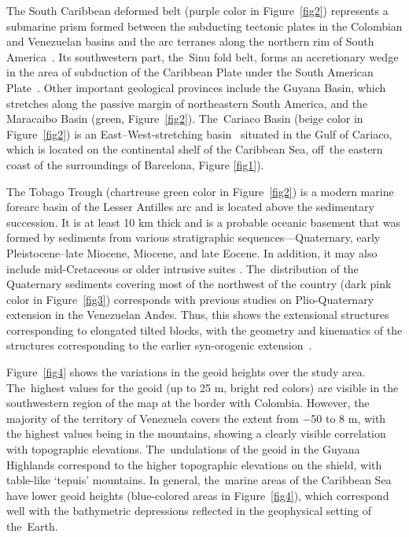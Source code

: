 \documentclass[sustainability,article,accept,pdftex,moreauthors]{Definitions/mdpi}
\begin{document}
The South Caribbean deformed belt (purple color in Figure~\ref{fig2}) represents a submarine prism formed between the subducting tectonic plates in the Colombian and Venezuelan basins and the arc terranes along the northern rim of South America~\cite{Mann}. Its {southwestern} part, the~Sinu fold belt{, }forms an accretionary wedge in the {area }of{ }subduction of the Caribbean Plate under {the }South American Plate~\cite{Rodriguez2021}. Other important geological provinces include the Guyana Basin, which stretches along the passive margin of {northeastern} South America, and the Maracaibo Basin (green, Figure~\ref{fig2}). The~Cariaco Basin (beige color in Figure~\ref{fig2}) is an East--West-stretching basin~\cite{Schubert} situated in the Gulf of Cariaco, which is {located }on the continental shelf of the Caribbean Sea, off~the eastern coast {of the surroundings of }Barcelona,{ }Figure \ref{fig1}). 

The Tobago Trough (chartreuse green color in Figure~\ref{fig2}) is a modern marine forearc basin of the Lesser Antilles arc and is located above the sedimentary succession{. It is }at least 10 km thick and is a probable oceanic basement{ that was }formed by sediments from various stratigraphic sequences---Quaternary, early Pleistocene--late Miocene, Miocene, and late Eocene{. In addition, it }may also include mid-Cretaceous or older {intrusive suites }\cite{Speed}. The~{distribution of the }Quaternary sediments covering  most of the northwest of the country (dark pink color in Figure~\ref{fig3}) corresponds{ }with  previous studies on Plio-Quaternary extension in the Venezuelan Andes{. Thus, this }shows{ }the extensional structures corresponding to  elongated tilted blocks, with the geometry and kinematics of the structures corresponding to the earlier syn-orogenic extension~\cite{Dhont}. 


Figure~\ref{fig4} shows the variations in the geoid heights over the study area. The~highest values for the geoid (up to 25 m, bright red {colors) }are visible in the southwestern region of the map {at the border with }Colombia{. However, }the majority of {the territory of }Venezuela covers the extent from $-$50 to 8 m, with the highest values being in the mountains{, showing a }clearly visible correlation with topographic elevations. The~undulations of the geoid in the Guyana Highlands correspond to the higher topographic elevations on the shield, with table-like  `tepuis' mountains. %
 In general, the~marine areas of the Caribbean Sea have  lower geoid heights (blue-colored areas in Figure~\ref{fig4}), which  correspond well with the bathymetric depressions reflected in the geophysical setting of the~Earth.
\end{document}
